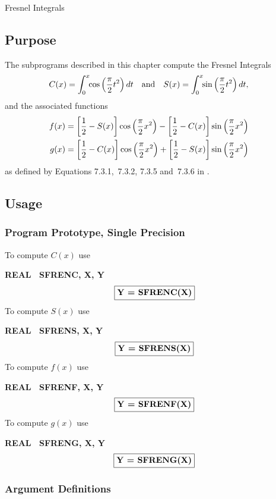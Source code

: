 \documentclass[twoside]{MATH77}
\begin{document}
 Fresnel Integrals


\subsection{Purpose}

The subprograms described in this chapter compute the Fresnel Integrals%
\begin{equation*}
\hspace{-13pt}C(x)=\int_0^x\!\!\cos \left( \frac \pi 2t^2\right) dt\quad
\text{and}\quad S(x)=\int_0^x\!\!\sin \left( \frac \pi 2t^2\right) dt,
\end{equation*}
and the associated functions%
\begin{align*}
\hspace{-13pt}f(x)&=\left[ \frac 12-S(x)\right] \cos \left(
\frac \pi 2x^2\right) -\left[\frac 12-C(x)\right] \sin \left(
\frac \pi 2x^2\right)\\
\hspace{-13pt}g(x)&=\left[ \frac 12-C(x)\right] \cos \left(
\frac \pi 2x^2\right) +\left[\frac 12-S(x)\right] \sin \left(
\frac \pi 2x^2\right)
\end{align*}
as defined by Equations 7.3.1,~7.3.2, 7.3.5 and~7.3.6 in \cite{ams55}.

\subsection{Usage}

\subsubsection{Program Prototype, Single Precision}

To compute $C(x)$ use

{\bf REAL \ SFRENC, X, Y}
$$
\fbox{{\bf Y = SFRENC(X)}}
$$
To compute $S(x)$ use

{\bf REAL \ SFRENS, X, Y}
$$
\fbox{{\bf Y = SFRENS(X)}}
$$
To compute $f(x)$ use

{\bf REAL \ SFRENF, X, Y}
$$
\fbox{{\bf Y = SFRENF(X)}}
$$
To compute $g(x)$ use

{\bf REAL \ SFRENG, X, Y}
$$
\fbox{{\bf Y = SFRENG(X)}}
$$

\subsubsection{Argument Definitions}
\end{document}
